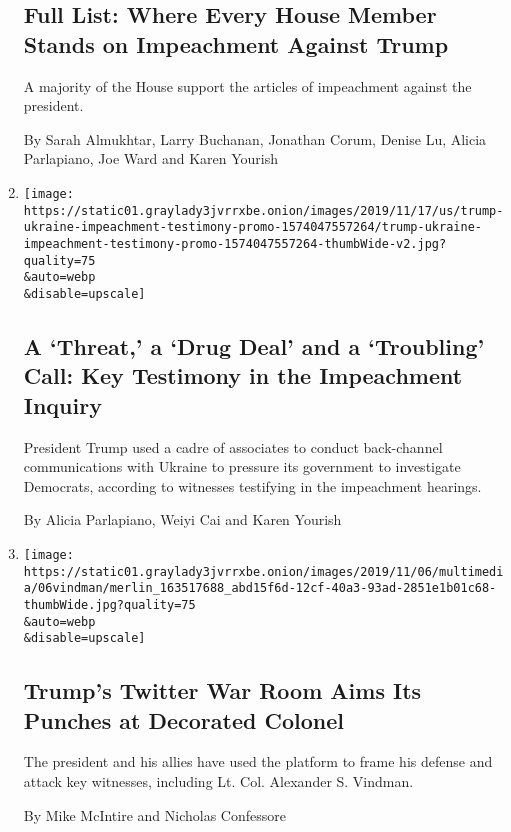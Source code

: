 \begin{enumerate}
  \hypertarget{full-list-where-every-house-member-stands-on-impeachment-against-trump}{%
  \subsection{Full List: Where Every House Member Stands on Impeachment
  Against
  Trump}\label{full-list-where-every-house-member-stands-on-impeachment-against-trump}}

  A majority of the House support the articles of impeachment against
  the president.

  By Sarah Almukhtar, Larry Buchanan, Jonathan Corum, Denise Lu, Alicia
  Parlapiano, Joe Ward and Karen Yourish
\item
  \href{/interactive/2019/11/18/us/politics/trump-ukraine-impeachment-testimony.html}{}

  \texttt{[image: https://static01.graylady3jvrrxbe.onion/images/2019/11/17/us/trump-ukraine-impeachment-testimony-promo-1574047557264/trump-ukraine-impeachment-testimony-promo-1574047557264-thumbWide-v2.jpg?quality=75\\\&auto=webp\\\&disable=upscale]}

  \hypertarget{a-threat-a-drug-deal-and-a-troubling-call-key-testimony-in-the-impeachment-inquiry}{%
  \subsection{A `Threat,' a `Drug Deal' and a `Troubling' Call: Key
  Testimony in the Impeachment
  Inquiry}\label{a-threat-a-drug-deal-and-a-troubling-call-key-testimony-in-the-impeachment-inquiry}}

  President Trump used a cadre of associates to conduct back-channel
  communications with Ukraine to pressure its government to investigate
  Democrats, according to witnesses testifying in the impeachment
  hearings.

  By Alicia Parlapiano, Weiyi Cai and Karen Yourish
\item
  \href{/2019/11/06/us/politics/trump-vindman-twitter.html}{}

  \texttt{[image: https://static01.graylady3jvrrxbe.onion/images/2019/11/06/multimedia/06vindman/merlin\_163517688\_abd15f6d-12cf-40a3-93ad-2851e1b01c68-thumbWide.jpg?quality=75\\\&auto=webp\\\&disable=upscale]}

  \hypertarget{trumps-twitter-war-room-aims-its-punches-at-decorated-colonel}{%
  \subsection{Trump's Twitter War Room Aims Its Punches at Decorated
  Colonel}\label{trumps-twitter-war-room-aims-its-punches-at-decorated-colonel}}

  The president and his allies have used the platform to frame his
  defense and attack key witnesses, including Lt. Col. Alexander S.
  Vindman.

  By Mike McIntire and Nicholas Confessore
\end{enumerate}

